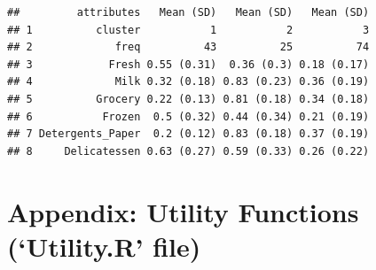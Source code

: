 \documentclass[]{article}
\begin{document}
\begin{verbatim}
##         attributes   Mean (SD)   Mean (SD)   Mean (SD)
## 1          cluster           1           2           3
## 2             freq          43          25          74
## 3            Fresh 0.55 (0.31)  0.36 (0.3) 0.18 (0.17)
## 4             Milk 0.32 (0.18) 0.83 (0.23) 0.36 (0.19)
## 5          Grocery 0.22 (0.13) 0.81 (0.18) 0.34 (0.18)
## 6           Frozen  0.5 (0.32) 0.44 (0.34) 0.21 (0.19)
## 7 Detergents_Paper  0.2 (0.12) 0.83 (0.18) 0.37 (0.19)
## 8     Delicatessen 0.63 (0.27) 0.59 (0.33) 0.26 (0.22)
\end{verbatim}

\section{\texorpdfstring{Appendix: Utility Functions (`Utility.R'
file)}{Appendix: Utility Functions (Utility.R file)}}\label{appendix-utility-functions-utility.r-file}
\end{document}
